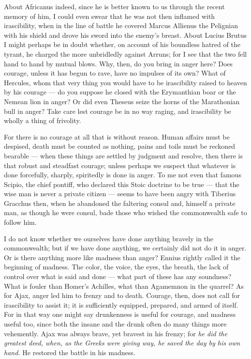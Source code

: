  About Africanus indeed, since he is better known to us through the recent memory of him, I could even swear that he was not then inflamed with irascibility, when in the line of battle he covered Marcus Allienus the Pelignian with his shield and drove his sword into the enemy's breast. About Lucius Brutus I might perhaps be in doubt whether, on account of his boundless hatred of the tyrant, he charged the more unbridledly against Arruns; for I see that the two fell hand to hand by mutual blows. Why, then, do you bring in anger here? Does courage, unless it has begun to rave, have no impulses of its own? What of Hercules, whom that very thing you would have to be irascibility raised to heaven by his courage — do you suppose he closed with the Erymanthian boar or the Nemean lion in anger? Or did even Theseus seize the horns of the Marathonian bull in anger? Take care lest courage be in no way raging, and irascibility be wholly a thing of frivolity.

 For there is no courage at all that is without reason. Human affairs must be despised, death must be counted as nothing, pains and toils must be reckoned bearable — when these things are settled by judgment and resolve, then there is that robust and steadfast courage; unless perhaps we suspect that whatever is done forcefully, sharply, spiritedly is done in anger. To me not even that famous Scipio, the chief pontiff, who declared this Stoic doctrine to be true — that the wise man is never a private citizen — seems to have been angry with Tiberius Gracchus then, when he abandoned the faltering consul and, himself a private man, as though he were consul, bade those who wished the commonwealth safe to follow him.

 I do not know whether we ourselves have done anything bravely in the commonwealth; but if we have done anything, we certainly did not do it in anger. Or is there anything more like madness than anger? Ennius rightly called it the beginning of madness. The color, the voice, the eyes, the breath, the lack of control over what is said and done — what part of these has any soundness? What is fouler than Homer's Achilles, what than Agamemnon in the quarrel? As for Ajax, anger led him to frenzy and to death. Courage, then, does not call for irascibility to assist it; it is sufficiently equipped, prepared, and armed of itself. For in that way one might say drunkenness is useful for courage, and madness useful too, since both the insane and the drunk often do many things more vehemently. Ajax was always brave, yet bravest in his frenzy; for \textit{he did the greatest deed, when, as the Greeks were giving way, he saved the day by his own hand.} He restored the battle in his madness.

